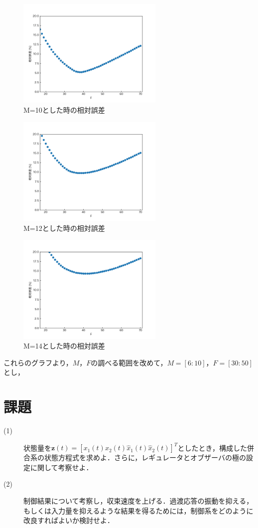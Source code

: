 \documentclass[12pt]{jsarticle}
\begin{document}
\begin{figure}[tb]
  \begin{center}
    \includegraphics[clip,width=7.0cm]{../img/M=10.png}
    \caption{M=10とした時の相対誤差}
    \label{Figure-M=10}
  \end{center}
\end{figure}
\begin{figure}[tb]
  \begin{center}
    \includegraphics[clip,width=7.0cm]{../img/M=12.png}
    \caption{M=12とした時の相対誤差}
    \label{Figure-M=12}
  \end{center}
\end{figure}
\begin{figure}[tb]
  \begin{center}
    \includegraphics[clip,width=7.0cm]{../img/M=14.png}
    \caption{M=14とした時の相対誤差}
    \label{Figure-M=14}
  \end{center}
\end{figure}
これらのグラフより，$M$，$F$の調べる範囲を改めて，$M=[6:10]$，$F=[30:50]$とし，
\section{課題}
\begin{description}
  \item[(1)] 状態量を${\bm z}(t) = [x_1(t) x_2(t) \hat{x}_1(t) \hat{x}_2(t)]^T$としたとき，構成した併合系の状態方程式を求めよ．さらに，レギュレータとオブザーバの極の設定に関して考察せよ．
  \item[(2)] 制御結果について考察し，収束速度を上げる．過渡応答の振動を抑える，もしくは入力量を抑えるような結果を得るためには，制御系をどのように改良すればよいか検討せよ．
\end{description}
\end{document}
